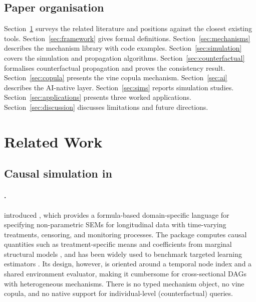 \documentclass[article]{jss}
\begin{document}
\subsection{Paper organisation}

Section~\ref{sec:related} surveys the related literature and positions
 against the closest existing tools. Section~\ref{sec:framework}
gives formal definitions. Section~\ref{sec:mechanisms} describes the mechanism
library with code examples. Section~\ref{sec:simulation} covers the simulation
and propagation algorithms. Section~\ref{sec:counterfactual} formalises
counterfactual propagation and proves the consistency result. Section~\ref{sec:copula}
presents the vine copula mechanism. Section~\ref{sec:ai} describes the AI-native
layer. Section~\ref{sec:sims} reports simulation studies. Section~\ref{sec:applications}
presents three worked applications. Section~\ref{sec:discussion} discusses
limitations and future directions.

\section{Related Work}
\label{sec:related}

\subsection{Causal simulation in }

\paragraph{.}
\citet{sofrygin2017simcausal} introduced , which provides a
formula-based domain-specific language for specifying non-parametric SEMs for
longitudinal data with time-varying treatments, censoring, and monitoring
processes. The package computes causal quantities such as treatment-specific means
and coefficients from marginal structural models \citep{robins2000marginal}, and
has been widely used to benchmark targeted learning estimators
\citep{luedtke2016tloss, laan2018targeted}. Its design, however, is oriented
around a temporal node index and a shared  environment evaluator,
making it cumbersome for cross-sectional DAGs with heterogeneous mechanisms. There
is no typed mechanism object, no vine copula, and no native support for
individual-level (counterfactual) queries.
\end{document}
